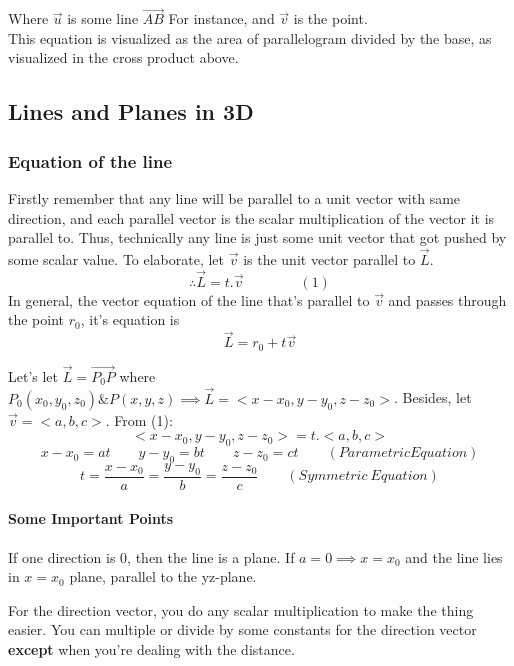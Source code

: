 \documentclass{article}
\begin{document}
Where $\vec{ u }$ is some line $ \vec{ AB } $ For instance, and $\vec{ v }$ is the point. \\ 
This equation is visualized as the area of parallelogram divided by the base, as visualized in the cross product above.
\\
\newpage
\subsection{Lines and Planes in 3D}

\subsubsection{Equation of the line}

Firstly remember that any line will be parallel to a unit vector with same direction, and each parallel vector is the scalar multiplication of the vector it is parallel to. Thus, technically any line is just some unit vector that got pushed by some scalar value. To elaborate, let $ \vec{ v } $ is the unit vector parallel to $ \vec{ L } $.
\[
	\therefore \vec{ L } = t . \vec{ v }	\qquad \qquad (1)
\]
In general, the vector equation of the line that's parallel to $ \vec{ v } $ and passes through the point $r_0$, it's equation is
\[
	\vec{ L } = r_0 + t \vec{ v }
\]

Let's let $\vec{ L } = \vec{ P_0P}$ where $ P_0(x_0,y_0,z_0) \& P(x,y,z) \implies \vec{L} = <x-x_0,y-y_0,z-z_0>$. Besides, let $ \vec{ v } = <a,b,c>$. From (1):
\begin{equation*}
	<x-x_0,y-y_0,z-z_0> = t. <a,b,c>  
\end{equation*}
\begin{equation*}
	x-x_0=at \qquad y-y_0=bt \qquad z-z_0=ct \qquad (Parametric Equation)
\end{equation*}
\[
	t= \frac{ x-x_0 }{a} = \frac{ y-y_0 }{b} = \frac{ z-z_0 }{c }   \qquad (Symmetric\ Equation)
\]

\paragraph{Some Important Points}
If one direction is 0, then the line is a plane. If $a=0 \implies x=x_0 $ and the line lies in $x=x_0$ plane, parallel to the yz-plane. 

For the direction vector, you do any scalar multiplication to make the thing easier. You can multiple or divide by some constants for the direction vector \textbf{except} when you're dealing with the distance.
\end{document}
